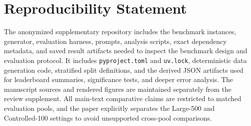 \section*{Reproducibility Statement}

The anonymized supplementary repository includes the benchmark
instances, generator, evaluation harness, prompts, analysis scripts,
exact dependency metadata, and saved result artifacts needed to inspect
the benchmark design and evaluation protocol.
It includes
\texttt{pyproject.toml} and \texttt{uv.lock}, deterministic data
generation code, stratified split definitions, and the derived JSON
artifacts used for leaderboard summaries, significance tests, and deeper
error analysis.
The manuscript sources and rendered figures are maintained separately
from the review supplement.
All main-text comparative claims are restricted to matched evaluation
pools, and the paper explicitly separates the Large-500 and
Controlled-100 settings to avoid unsupported cross-pool comparisons.
